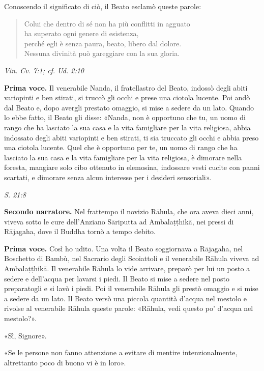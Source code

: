 Conoscendo il significato di ciò, il Beato esclamò queste parole:


\begin{quotation}
Colui che dentro di sé non ha più conflitti in agguato \\
ha superato ogni genere di esistenza, \\
perché egli è senza paura, beato, libero dal dolore. \\
Nessuna divinità può gareggiare con la sua gloria.
\end{quotation}

\emph{Vin. Cv. 7:1; cf. Ud. 2:10}


\textbf{Prima voce.} Il venerabile Nanda, il fratellastro del Beato, indossò
degli abiti variopinti e ben stirati, si truccò gli occhi e prese una
ciotola lucente. Poi andò dal Beato e, dopo avergli prestato omaggio, si
mise a sedere da un lato. Quando lo ebbe fatto, il Beato gli disse:
«Nanda, non è opportuno che tu, un uomo di rango che ha lasciato la sua
casa e la vita famigliare per la vita religiosa, abbia indossato degli
abiti variopinti e ben stirati, ti sia truccato gli occhi e abbia preso
una ciotola lucente. Quel che è opportuno per te, un uomo di rango che
ha lasciato la sua casa e la vita famigliare per la vita religiosa, è
dimorare nella foresta, mangiare solo cibo ottenuto in elemosina,
indossare vesti cucite con panni scartati, e dimorare senza alcun
interesse per i desideri sensoriali».


\emph{S. 21:8}


\textbf{Secondo narratore.} Nel frattempo il novizio Rāhula, che ora aveva dieci
anni, viveva sotto le cure dell’Anziano Sāriputta ad Ambalaṭṭhikā, nei
pressi di Rājagaha, dove il Buddha tornò a tempo debito.


\textbf{Prima voce.} Così ho udito. Una volta il Beato soggiornava a Rājagaha,
nel Boschetto di Bambù, nel Sacrario degli Scoiattoli e il venerabile
Rāhula viveva ad Ambalaṭṭhikā. Il venerabile Rāhula lo vide arrivare,
preparò per lui un posto a sedere e dell’acqua per lavarsi i piedi. Il
Beato si mise a sedere nel posto preparatogli e si lavò i piedi. Poi il
venerabile Rāhula gli prestò omaggio e si mise a sedere da un lato. Il
Beato versò una piccola quantità d’acqua nel mestolo e rivolse al
venerabile Rāhula queste parole: «Rāhula, vedi questo po’ d’acqua nel
mestolo?».


«Sì, Signore».


«Se le persone non fanno attenzione a evitare di mentire
intenzionalmente, altrettanto poco di buono vi è in loro».


